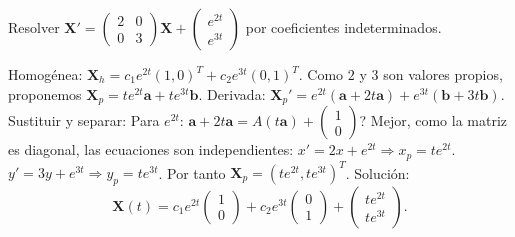 \begin{prob}
Resolver $\mathbf{X}'=
\begin{pmatrix}
2&0\\
0&3
\end{pmatrix}\mathbf{X}
+
\begin{pmatrix}
e^{2t}\\e^{3t}
\end{pmatrix}$ por coeficientes indeterminados.
\begin{myproof}
Homogénea: $\mathbf{X}_h=c_1 e^{2t}(1,0)^T+c_2 e^{3t}(0,1)^T$.
Como $2$ y $3$ son valores propios, proponemos $\mathbf{X}_p=t e^{2t}\mathbf{a}+ t e^{3t}\mathbf{b}$.
Derivada: $\mathbf{X}_p'=e^{2t}(\mathbf{a}+2t\mathbf{a})+e^{3t}(\mathbf{b}+3t\mathbf{b})$.
Sustituir y separar:
Para $e^{2t}$: $\mathbf{a}+2t\mathbf{a}=A(t\mathbf{a})+\begin{pmatrix}1\\0\end{pmatrix}$? Mejor, como la matriz es diagonal, las ecuaciones son independientes:
$x'=2x+e^{2t}\Rightarrow x_p=t e^{2t}$.
$y'=3y+e^{3t}\Rightarrow y_p=t e^{3t}$.
Por tanto $\mathbf{X}_p=(t e^{2t}, t e^{3t})^T$.
Solución:
\[
\boxed{
\mathbf{X}(t)=c_1 e^{2t}
\begin{pmatrix}
1\\0
\end{pmatrix}
+c_2 e^{3t}
\begin{pmatrix}
0\\1
\end{pmatrix}
+
\begin{pmatrix}
t e^{2t}\\
t e^{3t}
\end{pmatrix}.
}
\]
\end{myproof}
\end{prob}

